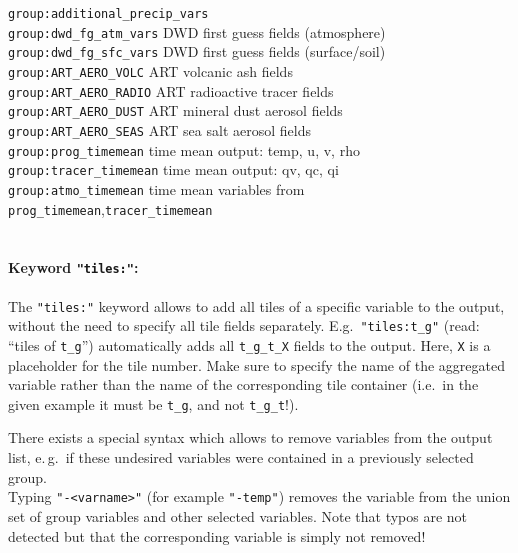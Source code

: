 \begin{tabbing}
\texttt{group:additional\_precip\_vars}\>                                                                           \\
\texttt{group:dwd\_fg\_atm\_vars}      \>     DWD first guess fields (atmosphere)                                   \\
\texttt{group:dwd\_fg\_sfc\_vars}      \>     DWD first guess fields (surface/soil)                                 \\
\texttt{group:ART\_AERO\_VOLC}         \>     ART volcanic ash fields                                               \\
\texttt{group:ART\_AERO\_RADIO}        \>     ART radioactive tracer fields                                         \\
\texttt{group:ART\_AERO\_DUST}         \>     ART mineral dust aerosol fields                                       \\
\texttt{group:ART\_AERO\_SEAS}         \>     ART sea salt aerosol fields                                           \\
\texttt{group:prog\_timemean}          \>     time mean output: temp, u, v, rho                                     \\
\texttt{group:tracer\_timemean}        \>     time mean output: qv, qc, qi                                          \\
\texttt{group:atmo\_timemean}          \>     time mean variables from \texttt{prog\_timemean},\texttt{tracer\_timemean}\\                                                  \\
\end{tabbing}

\paragraph{Keyword \texttt{"tiles:"}:}
The \texttt{"tiles:"} keyword allows to add all tiles of a specific variable to the output, without the need to specify all
tile fields separately. E.g.\ \texttt{"tiles:t\_g"} (read: ``tiles of \texttt{t\_g}'') automatically adds all \texttt{t\_g\_t\_X}
fields to the output. Here, \texttt{X} is a placeholder for the tile number. Make sure to specify the name of the aggregated
variable rather than the name of the corresponding tile container (i.e.\ in the given example it must be \texttt{t\_g}, and not
\texttt{t\_g\_t}!).

\begin{note}
      There exists a special syntax which allows to remove variables from the output list, e.\,g.\ if
      these undesired variables were contained in a previously selected group.\\
      Typing \texttt{"-\textnormal{<varname>}"} (for example \texttt{"-temp"}) removes the
      variable from the union set of group variables and other selected variables.
      Note that typos are not detected but that the corresponding variable is
      simply not removed!
\end{note}

